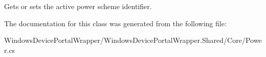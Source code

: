 Gets or sets the active power scheme identifier. 



The documentation for this class was generated from the following file\+:\begin{DoxyCompactItemize}
\item 
Windows\+Device\+Portal\+Wrapper/\+Windows\+Device\+Portal\+Wrapper.\+Shared/\+Core/Power.\+cs\end{DoxyCompactItemize}
